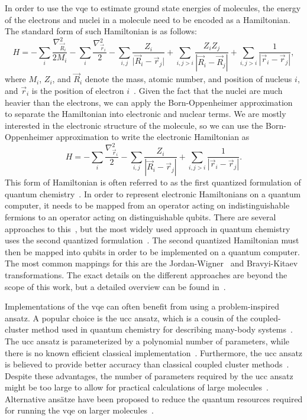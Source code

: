 In order to use the \gls{vqe} to estimate ground state energies of molecules, the energy of the electrons and nuclei in a molecule need to be encoded as a Hamiltonian.
The standard form of such Hamiltonian is as follows:
\begin{equation}
H = - \sum_i \frac{\nabla_{\vec{R}_i}^2}{2M_i}
    - \sum_i \frac{\nabla_{\vec{r}_i}^2}{2}
    - \sum_{i,j} \frac{Z_i}{\lvert\vec{R}_i - \vec{r}_j\rvert}
    + \sum_{i,j>i} \frac{Z_iZ_j}{|\vec{R}_i - \vec{R}_j|}
    + \sum_{i,j>i} \frac{1}{|\vec{r}_i - \vec{r}_j|},
\end{equation}
where $M_i$, $Z_i$, and $\vec{R}_i$ denote the mass, atomic number, and position of nucleus $i$, and $\vec{r}_i$ is the position of electron $i$~\cite{mcardle2018quantum}.
Given the fact that the nuclei are much heavier than the electrons, we can apply the Born-Oppenheimer approximation~\cite{born1927quantentheorie} to separate the Hamiltonian into electronic and nuclear terms.
We are mostly interested in the electronic structure of the molecule, so we can use the Born-Oppenheimer approximation to write the electronic Hamiltonian as
\begin{equation} 
H = - \sum_i \frac{\nabla_{\vec{r}_i}^2}{2}
- \sum_{i,j} \frac{Z_i}{|\vec{R}_i - \vec{r}_j|}
+ \sum_{i,j>i} \frac{1}{|\vec{r}_i - \vec{r}_j|}.
\end{equation}
This form of Hamiltonian is often referred to as the first quantized formulation of quantum chemistry~\cite[Appendix A]{o2016scalable}.
In order to represent electronic Hamiltonians on a quantum computer, it needs to be mapped from an operator acting on indistinguishable fermions to an operator acting on distinguishable qubits.
There are several approaches to this~\cite{kassal2011simulating}, but the most widely used approach in quantum chemistry uses the second quantized formulation~\cite{mcardle2018quantum}.
The second quantized Hamiltonian must then be mapped into qubits in order to be implemented on a quantum computer.
The most common mappings for this are the Jordan-Wigner~\cite{somma2002simulating} and Bravyi-Kitaev~\cite{seeley2012bravyi} transformations.
The exact details on the different approaches are beyond the scope of this work, but a detailed overview can be found in~\cite{mcardle2018quantum}.

Implementations of the \gls{vqe} can often benefit from using a problem-inspired ansatz.
A popular choice is the \gls{ucc} ansatz, which is a cousin of the coupled-cluster method used in quantum chemistry for describing many-body systems~\cite{shavitt2009many}.
The \gls{ucc} ansatz is parameterized by a polynomial number of parameters, while there is no known efficient classical implementation~\cite{taube2006new}.
Furthermore, the \gls{ucc} ansatz is believed to provide better accuracy than classical coupled cluster methods~\cite{cooper2010benchmark, evangelista2011alternative}.
Despite these advantages, the number of parameters required by the \gls{ucc} ansatz might be too large to allow for practical calculations of large molecules~\cite{wecker2015progress}.
Alternative ans{\"a}tze have been proposed to reduce the quantum resources required for running the \gls{vqe} on larger molecules~\cite{romero2018strategies, kandala2017hardware, grimsley2019adaptive}.

